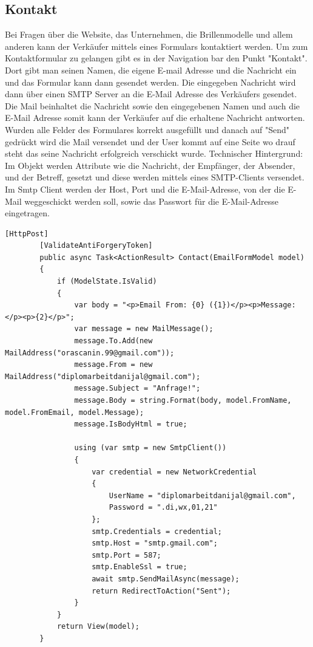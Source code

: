 \subsection{Kontakt}
Bei Fragen über die Website, das Unternehmen, die Brillenmodelle und allem anderen kann der Verkäufer mittels eines Formulars kontaktiert werden. Um zum Kontaktformular zu gelangen gibt es in der Navigation bar den Punkt "Kontakt". Dort gibt man seinen Namen, die eigene E-mail Adresse und die Nachricht ein und das Formular kann dann gesendet werden. Die eingegeben Nachricht wird dann über einen SMTP Server an die E-Mail Adresse des Verkäufers gesendet. Die Mail beinhaltet die Nachricht sowie den eingegebenen Namen und auch die E-Mail Adresse somit kann der Verkäufer auf die erhaltene Nachricht antworten. Wurden alle Felder des Formulares korrekt ausgefüllt und danach auf "Send" gedrückt wird die Mail versendet und der User kommt auf eine Seite wo drauf steht das seine Nachricht erfolgreich verschickt wurde.
Technischer Hintergrund:
Im Objekt werden Attribute wie die Nachricht, der Empfänger, der Absender, und der Betreff, gesetzt und diese werden mittels eines SMTP-Clients versendet.
Im Smtp Client werden der Host, Port und die E-Mail-Adresse, von der die E-Mail weggeschickt werden soll, sowie das Passwort für die E-Mail-Adresse eingetragen.
\begin{lstlisting}
[HttpPost]
        [ValidateAntiForgeryToken]
        public async Task<ActionResult> Contact(EmailFormModel model)
        {
            if (ModelState.IsValid)
            {
                var body = "<p>Email From: {0} ({1})</p><p>Message:</p><p>{2}</p>";
                var message = new MailMessage();
                message.To.Add(new MailAddress("orascanin.99@gmail.com"));
                message.From = new MailAddress("diplomarbeitdanijal@gmail.com");
                message.Subject = "Anfrage!";
                message.Body = string.Format(body, model.FromName, model.FromEmail, model.Message);
                message.IsBodyHtml = true;

                using (var smtp = new SmtpClient())
                {
                    var credential = new NetworkCredential
                    {
                        UserName = "diplomarbeitdanijal@gmail.com",
                        Password = ".di,wx,01,21"
                    };
                    smtp.Credentials = credential;
                    smtp.Host = "smtp.gmail.com";
                    smtp.Port = 587;
                    smtp.EnableSsl = true;
                    await smtp.SendMailAsync(message);
                    return RedirectToAction("Sent");
                }
            }
            return View(model);
        }
\end{lstlisting}
